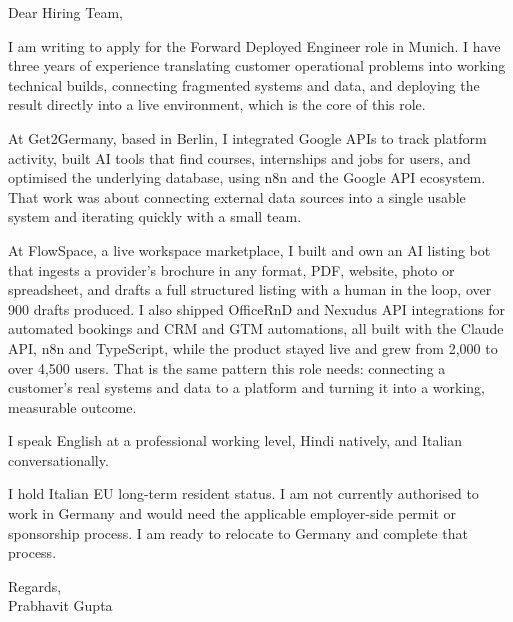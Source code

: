 \documentclass[a4paper,11pt]{article}
\begin{document}
Dear Hiring Team,

I am writing to apply for the Forward Deployed Engineer role in Munich. I have three years of experience translating customer operational problems into working technical builds, connecting fragmented systems and data, and deploying the result directly into a live environment, which is the core of this role.

At Get2Germany, based in Berlin, I integrated Google APIs to track platform activity, built AI tools that find courses, internships and jobs for users, and optimised the underlying database, using n8n and the Google API ecosystem. That work was about connecting external data sources into a single usable system and iterating quickly with a small team.

At FlowSpace, a live workspace marketplace, I built and own an AI listing bot that ingests a provider's brochure in any format, PDF, website, photo or spreadsheet, and drafts a full structured listing with a human in the loop, over 900 drafts produced. I also shipped OfficeRnD and Nexudus API integrations for automated bookings and CRM and GTM automations, all built with the Claude API, n8n and TypeScript, while the product stayed live and grew from 2,000 to over 4,500 users. That is the same pattern this role needs: connecting a customer's real systems and data to a platform and turning it into a working, measurable outcome.

I speak English at a professional working level, Hindi natively, and Italian conversationally.

I hold Italian EU long-term resident status. I am not currently authorised to work in Germany and would need the applicable employer-side permit or sponsorship process. I am ready to relocate to Germany and complete that process.

Regards,\\
Prabhavit Gupta
\end{document}
